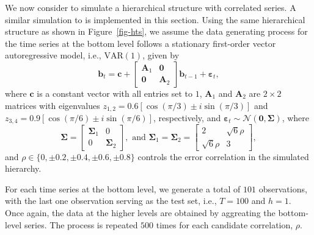 \documentclass[
  12pt,
  11pt]{article}
\begin{document}
We now consider to simulate a hierarchical structure with correlated
series. A similar simulation to \citet{Wickramasuriya2021-am} is
implemented in this section. Using the same hierarchical structure as
shown in Figure~\ref{fig-hts}, we assume the data generating process for
the time series at the bottom level follows a stationary first-order
vector autoregressive model, i.e., \(\text{VAR}(1)\), given by \[
\bm{b}_t= \bm{c} + \left[\begin{array}{cc}
\bm{A}_1 & \bm{0} \\
\bm{0} & \bm{A}_2
\end{array}\right] \bm{b}_{t-1} + \bm{\varepsilon}_t,
\] where \(\bm{c}\) is a constant vector with all entries set to \(1\),
\(\bm{A}_1\) and \(\bm{A}_2\) are \(2 \times 2\) matrices with
eigenvalues \(z_{1,2}=0.6[\cos (\pi / 3) \pm i \sin (\pi / 3)]\) and
\(z_{3,4}=0.9[\cos (\pi / 6) \pm i \sin (\pi / 6)]\), respectively, and
\(\bm{\varepsilon}_t \sim \mathcal{N}(\bm{0}, \bm{\Sigma})\), where \[
\bm{\Sigma}=\left[\begin{array}{cc}
\bm{\Sigma}_1 & 0 \\0 & \bm{\Sigma}_2
\end{array}\right], \text { and } \bm{\Sigma}_1=\bm{\Sigma}_2=\left[\begin{array}{cc}2 & \sqrt{6} \rho \\\sqrt{6} \rho & 3\end{array}\right],
\] and \(\rho \in \{0, \pm 0.2, \pm 0.4, \pm 0.6, \pm 0.8\}\) controls
the error correlation in the simulated hierarchy.

For each time series at the bottom level, we generate a total of \(101\)
observations, with the last one observation serving as the test set,
i.e., \(T=100\) and \(h=1\). Once again, the data at the higher levels
are obtained by aggreating the bottom-level series. The process is
repeated \(500\) times for each candidate correlation, \(\rho\).
\end{document}
